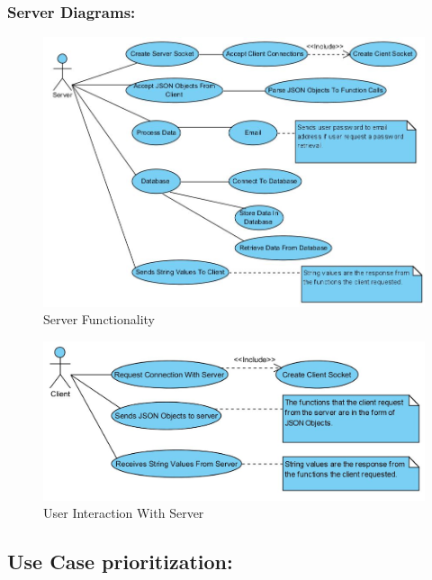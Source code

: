 \documentclass[letterpaper]{article}
\begin{document}
				\vspace{0.2in}
				\subsubsection*{Server Diagrams:}
				\vspace{0.2in}
				
					\begin{figure}[H]
					\centering
					\includegraphics[width=140mm]{UML_Diagram/Use_Case/Server.jpg}
					\caption{Server Functionality}
					\end{figure}
					
					\begin{figure}[H]
					\centering
					\includegraphics[width=140mm]{UML_Diagram/Use_Case/Client.jpg}
					\caption{User Interaction With Server}
					\end{figure}
				
			\vspace{0.2in}
			\subsection*{Use Case prioritization:}
			\vspace{0.1in}
					
\end{document}
